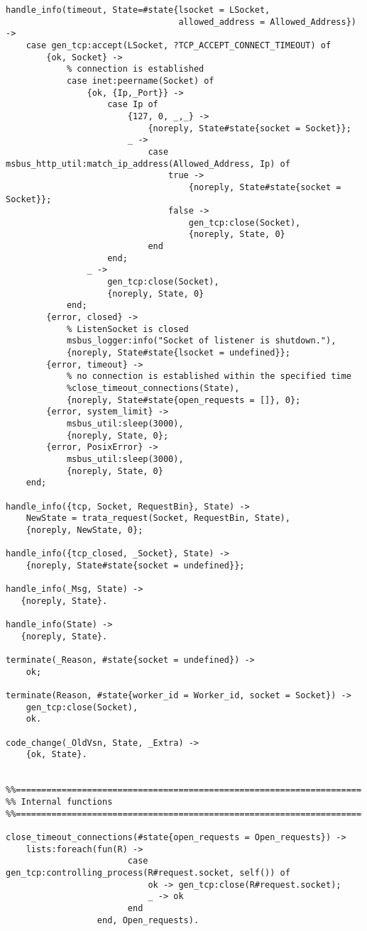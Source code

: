 \begin{lstlisting}
handle_info(timeout, State=#state{lsocket = LSocket, 
                                  allowed_address = Allowed_Address}) ->
	case gen_tcp:accept(LSocket, ?TCP_ACCEPT_CONNECT_TIMEOUT) of
		{ok, Socket} -> 
			% connection is established
			case inet:peername(Socket) of
				{ok, {Ip,_Port}} -> 
					case Ip of
						{127, 0, _,_} -> 
							{noreply, State#state{socket = Socket}};
						_ -> 
							case msbus_http_util:match_ip_address(Allowed_Address, Ip) of
								true -> 
									{noreply, State#state{socket = Socket}};
								false -> 
									gen_tcp:close(Socket),
									{noreply, State, 0}
							end
					end;
				_ -> 
					gen_tcp:close(Socket),
					{noreply, State, 0}
			end;
		{error, closed} -> 
			% ListenSocket is closed
			msbus_logger:info("Socket of listener is shutdown."),
			{noreply, State#state{lsocket = undefined}}; 
		{error, timeout} ->
			% no connection is established within the specified time
			%close_timeout_connections(State),
			{noreply, State#state{open_requests = []}, 0};
		{error, system_limit} ->
			msbus_util:sleep(3000),
			{noreply, State, 0};
		{error, PosixError} ->
			msbus_util:sleep(3000),
			{noreply, State, 0}
	end;

handle_info({tcp, Socket, RequestBin}, State) ->
	NewState = trata_request(Socket, RequestBin, State),
	{noreply, NewState, 0};

handle_info({tcp_closed, _Socket}, State) ->
	{noreply, State#state{socket = undefined}};

handle_info(_Msg, State) ->
   {noreply, State}.

handle_info(State) ->
   {noreply, State}.

terminate(_Reason, #state{socket = undefined}) ->
    ok;

terminate(Reason, #state{worker_id = Worker_id, socket = Socket}) ->
	gen_tcp:close(Socket),
    ok.

code_change(_OldVsn, State, _Extra) ->
    {ok, State}.

	
%%====================================================================
%% Internal functions
%%====================================================================

close_timeout_connections(#state{open_requests = Open_requests}) ->
	lists:foreach(fun(R) -> 
						case gen_tcp:controlling_process(R#request.socket, self()) of
							ok -> gen_tcp:close(R#request.socket);
							_ -> ok
						end
				  end, Open_requests).
	


\end{lstlisting}
